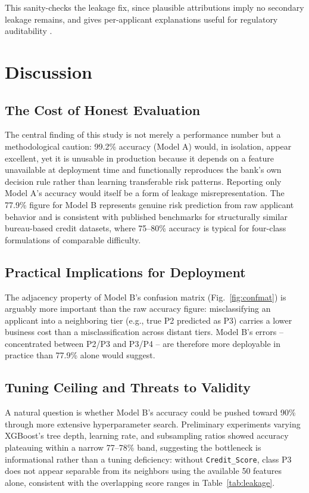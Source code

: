 \documentclass[conference]{IEEEtran}
\begin{document}
This sanity-checks the leakage fix, since plausible attributions imply no secondary leakage remains, and gives per-applicant explanations useful for regulatory auditability \cite{lundberg2017shap}.

\section{Discussion}

\subsection{The Cost of Honest Evaluation}
The central finding of this study is not merely a performance number but a methodological caution: 99.2\% accuracy (Model A) would, in isolation, appear excellent, yet it is unusable in production because it depends on a feature unavailable at deployment time and functionally reproduces the bank's own decision rule rather than learning transferable risk patterns. Reporting only Model A's accuracy would itself be a form of leakage misrepresentation. The 77.9\% figure for Model B represents genuine risk prediction from raw applicant behavior and is consistent with published benchmarks for structurally similar bureau-based credit datasets, where 75--80\% accuracy is typical for four-class formulations of comparable difficulty.

\subsection{Practical Implications for Deployment}
The adjacency property of Model B's confusion matrix (Fig.~\ref{fig:confmat}) is arguably more important than the raw accuracy figure: misclassifying an applicant into a neighboring tier (e.g., true P2 predicted as P3) carries a lower business cost than a misclassification across distant tiers. Model B's errors -- concentrated between P2/P3 and P3/P4 -- are therefore more deployable in practice than 77.9\% alone would suggest.

\subsection{Tuning Ceiling and Threats to Validity}
A natural question is whether Model B's accuracy could be pushed toward 90\% through more extensive hyperparameter search. Preliminary experiments varying XGBoost's tree depth, learning rate, and subsampling ratios showed accuracy plateauing within a narrow 77--78\% band, suggesting the bottleneck is informational rather than a tuning deficiency: without \texttt{Credit\_Score}, class P3 does not appear separable from its neighbors using the available 50 features alone, consistent with the overlapping score ranges in Table~\ref{tab:leakage}.
\end{document}
